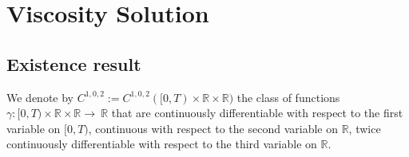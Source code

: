 \documentclass[8pt]{article}
\begin{document}
\section{Viscosity Solution}

\subsection{Existence result}

We denote by $C^{1,0,2}:=C^{1,0,2}([0,T) \times \mathbb{R} \times \mathbb{R})$ the class of functions $\gamma:[0,T) \times \mathbb{R} \times \mathbb{R} \to\ \mathbb{R}$ that are continuously differentiable with respect to the first variable on $[0,T)$, continuous with respect to the second variable on $\mathbb{R}$, twice continuously differentiable  with respect to the third variable on $\mathbb{R}$.
\end{document}
